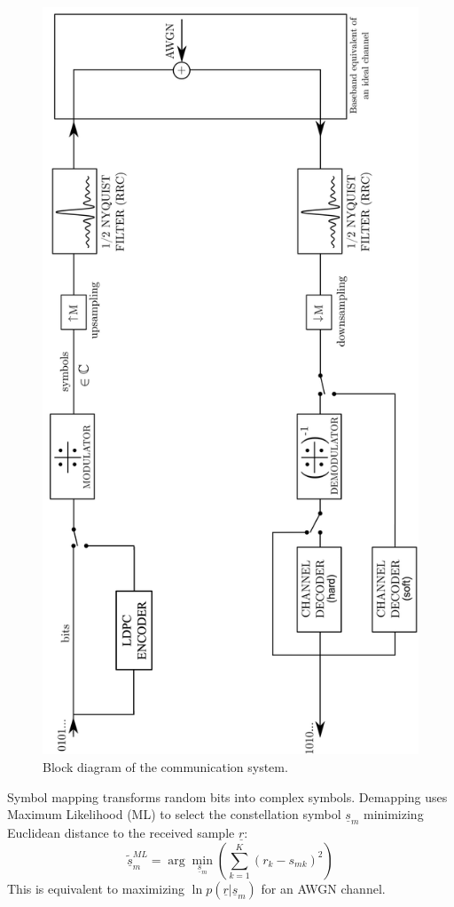 \documentclass[11pt]{article}
\begin{document}
	\begin{figure}[H]
		\centering
		\includegraphics[angle=-90, width=0.7\linewidth]{Images/com-chain}
		\caption{Block diagram of the communication system.}
		\label{fig:com-chain}
	\end{figure}
	
	Symbol mapping transforms random bits into complex symbols. Demapping uses Maximum Likelihood (ML) to select the constellation symbol $\underline{s}_{m}$ minimizing Euclidean distance to the received sample $\underline{r}$:
	\begin{equation}
		\tilde{\underline{s}}_{m}^{ML} = \arg\min_{\underline{s}_{m}} \left(\sum_{k=1}^{K}(r_{k}-s_{mk})^{2}\right)
	\end{equation}
	This is equivalent to maximizing $\ln p(\underline{r}|\underline{s}_{m})$ for an AWGN channel.
	
\end{document}
